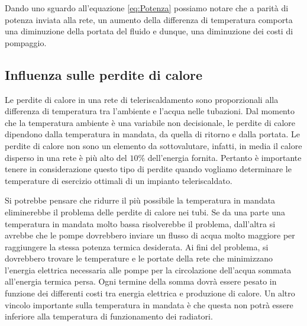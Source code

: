 \documentclass[laurea,oneside,11pt]{USiena_tesiLM}
\begin{document}
Dando uno sguardo all'equazione \ref{eq:Potenza} possiamo notare che a parità di potenza inviata alla rete, un aumento della differenza di temperatura comporta una diminuzione della portata del fluido e dunque, una diminuzione dei costi di pompaggio.



\subsection{Influenza sulle perdite di calore}
Le perdite di calore in una rete di teleriscaldamento sono proporzionali alla differenza di temperatura tra l'ambiente e l'acqua nelle tubazioni. Dal momento che la temperatura ambiente è una variabile non decisionale, le perdite di calore dipendono dalla temperatura in mandata, da quella di ritorno e dalla portata. Le perdite di calore non sono un elemento da sottovalutare, infatti, in media il calore disperso in una rete è più alto del $10\%$ dell'energia fornita. Pertanto è importante tenere in considerazione questo tipo di perdite quando vogliamo determinare le temperature di esercizio ottimali di un impianto teleriscaldato.

Si potrebbe pensare che ridurre il più possibile la temperatura in mandata eliminerebbe il problema delle perdite di calore nei tubi. Se da una parte una temperatura in mandata molto bassa risolverebbe il problema, dall'altra si avrebbe che le pompe dovrebbero inviare un flusso di acqua molto maggiore per raggiungere la stessa potenza termica desiderata. Ai fini del problema, si dovrebbero trovare le temperature e le portate  della rete che minimizzano l'energia elettrica necessaria alle pompe per la circolazione dell'acqua sommata all'energia termica persa. Ogni termine della somma dovrà essere pesato 
in funzione dei differenti costi tra energia elettrica e produzione di calore.
Un altro vincolo importante sulla temperatura in mandata è che questa non potrà essere inferiore alla temperatura di funzionamento dei radiatori.  
\end{document}
